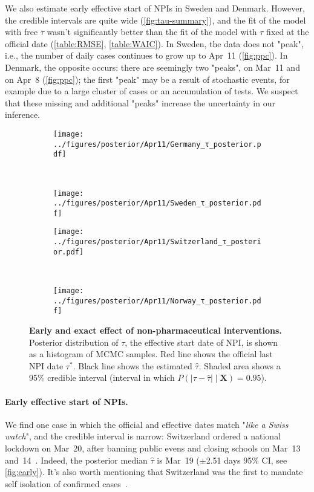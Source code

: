 \documentclass[12pt]{extarticle}
\let\vec\mathbf
\begin{document}
We also estimate early effective start of NPIs in Sweden and Denmark.
However, the credible intervals are quite wide (\autoref{fig:tau-summary}), and the fit of the model with free $\tau$ wasn't significantly better than the fit of the model with $\tau$ fixed at the official date (\autoref{table:RMSE}, \autoref{table:WAIC}).
In Sweden, the data does not "peak", i.e., the number of daily cases continues to grow up to Apr~11 (\autoref{fig:ppc}). 
In Denmark, the opposite occurs: there are seemingly two "peaks", on Mar~11 and on Apr~8 (\autoref{fig:ppc}); the first "peak" may be a result of stochastic events, for example due to a large cluster of cases or an accumulation of tests.
We suspect that these missing and additional "peaks" increase the uncertainty in our inference.



\begin{figure}[h]
    \centering
    \begin{subfigure}{0.45\textwidth}
        \texttt{[image: ../figures/posterior/Apr11/Germany\_τ\_posterior.pdf]}
    \end{subfigure}
    ~
    \begin{subfigure}{0.45\textwidth}
		\texttt{[image: ../figures/posterior/Apr11/Sweden\_τ\_posterior.pdf]}
    \end{subfigure}
    
	\begin{subfigure}{0.45\textwidth}
        \texttt{[image: ../figures/posterior/Apr11/Switzerland\_τ\_posterior.pdf]}
    \end{subfigure}
    ~
    \begin{subfigure}{0.45\textwidth}
		\texttt{[image: ../figures/posterior/Apr11/Norway\_τ\_posterior.pdf]}
    \end{subfigure}
    \caption{
    \textbf{Early and exact effect of non-pharmaceutical interventions.}
    Posterior distribution of $\tau$, the effective start date of NPI, is shown as a histogram of MCMC samples. Red line shows the official last NPI date $\tau^*$. Black line shows the estimated $\hat{\tau}$. Shaded area shows a 95\% credible interval (interval in which $P(|\tau - \hat{\tau}| \mid \vec{X}) = 0.95$). 
	}
	\label{fig:early}
\end{figure}


\paragraph*{Early effective start of NPIs.}
We find one case in which the official and effective dates match "\emph{like a Swiss watch}", and the credible interval is narrow: Switzerland ordered a national lockdown on Mar~20, after banning public evens and closing schools on Mar~13 and~14~\citep{Flaxman2020}.
Indeed, the posterior median $\hat{\tau}$ is Mar~19 ($\pm$2.51 days 95\% CI, see \autoref{fig:early}). It's also worth mentioning that Switzerland was the first to mandate self isolation of confirmed cases~\citep{Flaxman2020}.
\end{document}
